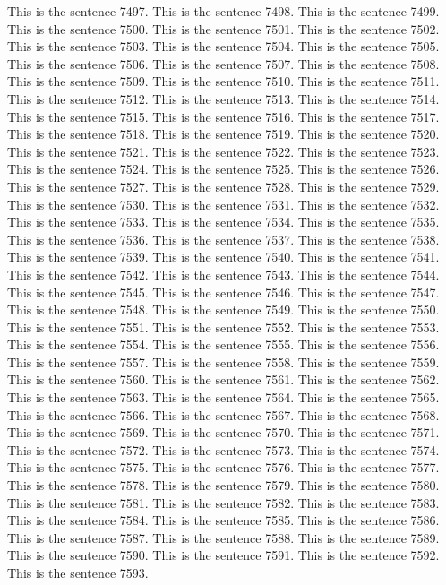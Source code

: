 \documentclass{article}
\begin{document}
This is the sentence 7497.
This is the sentence 7498.
This is the sentence 7499.
This is the sentence 7500.
This is the sentence 7501.
This is the sentence 7502.
This is the sentence 7503.
This is the sentence 7504.
This is the sentence 7505.
This is the sentence 7506.
This is the sentence 7507.
This is the sentence 7508.
This is the sentence 7509.
This is the sentence 7510.
This is the sentence 7511.
This is the sentence 7512.
This is the sentence 7513.
This is the sentence 7514.
This is the sentence 7515.
This is the sentence 7516.
This is the sentence 7517.
This is the sentence 7518.
This is the sentence 7519.
This is the sentence 7520.
This is the sentence 7521.
This is the sentence 7522.
This is the sentence 7523.
This is the sentence 7524.
This is the sentence 7525.
This is the sentence 7526.
This is the sentence 7527.
This is the sentence 7528.
This is the sentence 7529.
This is the sentence 7530.
This is the sentence 7531.
This is the sentence 7532.
This is the sentence 7533.
This is the sentence 7534.
This is the sentence 7535.
This is the sentence 7536.
This is the sentence 7537.
This is the sentence 7538.
This is the sentence 7539.
This is the sentence 7540.
This is the sentence 7541.
This is the sentence 7542.
This is the sentence 7543.
This is the sentence 7544.
This is the sentence 7545.
This is the sentence 7546.
This is the sentence 7547.
This is the sentence 7548.
This is the sentence 7549.
This is the sentence 7550.
This is the sentence 7551.
This is the sentence 7552.
This is the sentence 7553.
This is the sentence 7554.
This is the sentence 7555.
This is the sentence 7556.
This is the sentence 7557.
This is the sentence 7558.
This is the sentence 7559.
This is the sentence 7560.
This is the sentence 7561.
This is the sentence 7562.
This is the sentence 7563.
This is the sentence 7564.
This is the sentence 7565.
This is the sentence 7566.
This is the sentence 7567.
This is the sentence 7568.
This is the sentence 7569.
This is the sentence 7570.
This is the sentence 7571.
This is the sentence 7572.
This is the sentence 7573.
This is the sentence 7574.
This is the sentence 7575.
This is the sentence 7576.
This is the sentence 7577.
This is the sentence 7578.
This is the sentence 7579.
This is the sentence 7580.
This is the sentence 7581.
This is the sentence 7582.
This is the sentence 7583.
This is the sentence 7584.
This is the sentence 7585.
This is the sentence 7586.
This is the sentence 7587.
This is the sentence 7588.
This is the sentence 7589.
This is the sentence 7590.
This is the sentence 7591.
This is the sentence 7592.
This is the sentence 7593.
\end{document}
